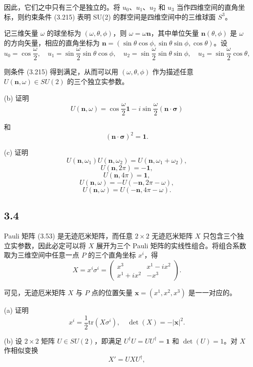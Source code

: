 因此，它们之中只有三个是独立的。将 $ u_0 $、$ u_1 $、$ u_2 $ 和 $ u_3 $ 当作四维空间的直角坐标，则约束条件 (3.215) 表明 SU(2) 的群空间是四维空间中的三维球面 $ S^3 $。

记三维矢量 $ \omega $ 的球坐标为 $ (\omega, \theta, \phi) $，则 $ \omega = \omega \mathbf{n} $，其中单位矢量 $ \mathbf{n}(\theta, \phi) $ 是 $ \omega $ 的方向矢量，相应的直角坐标为 $ \mathbf{n} = (\sin \theta \cos \phi, \sin \theta \sin \phi, \cos \theta) $。设
$$ u_0 = \cos \frac{\omega}{2}, \quad u_1 = \sin \frac{\omega}{2} \sin \theta \cos \phi, \quad u_2 = \sin \frac{\omega}{2} \sin \theta \sin \phi, \quad u_3 = \sin \frac{\omega}{2} \cos \theta, \tag{3.216} $$

则条件 (3.215) 得到满足，从而可以用 $ (\omega, \theta, \phi) $ 作为描述任意 $ U(\mathbf{n}, \omega) \in SU(2) $ 的三个独立实参数。

(b) 证明
$$ U(\mathbf{n}, \omega) = \cos \frac{\omega}{2} \mathbf{1} - i \sin \frac{\omega}{2} (\mathbf{n} \cdot \boldsymbol{\sigma}) \tag{3.217} $$

和
$$ (\mathbf{n} \cdot \boldsymbol{\sigma})^2 = \mathbf{1}. \tag{3.218} $$

(c) 证明
$$ U(\mathbf{n}, \omega_1) U(\mathbf{n}, \omega_2) = U(\mathbf{n}, \omega_1 + \omega_2), \tag{3.219} $$
$$ U(\mathbf{n}, 2\pi) = -\mathbf{1}, \tag{3.220} $$
$$ U(\mathbf{n}, 4\pi) = \mathbf{1}, \tag{3.221} $$
$$ U(\mathbf{n}, \omega) = -U(-\mathbf{n}, 2\pi - \omega), \tag{3.222} $$
$$ U(\mathbf{n}, \omega) = U(-\mathbf{n}, 4\pi - \omega). \tag{3.223} $$

\newpage
\subsection{3.4}
Pauli 矩阵 (3.53) 是无迹厄米矩阵，而任意 $ 2 \times 2 $ 无迹厄米矩阵 $ X $ 只包含三个独立实参数，因此必定可以将 $ X $ 展开为三个 Pauli 矩阵的实线性组合。将组合系数取为三维空间中任意一点 $ P $ 的三个直角坐标 $ x^i $，得
$$ X = x^i \sigma^i = \begin{pmatrix} x^3 & x^1 - i x^2 \\ x^1 + i x^2 & -x^3 \end{pmatrix}. \tag{3.224} $$

可见，无迹厄米矩阵 $ X $ 与 $ P $ 点的位置矢量 $ \mathbf{x} = (x^1, x^2, x^3) $ 是一一对应的。

(a) 证明
$$ x^i = \frac{1}{2} \mathrm{tr}(X \sigma^i), \quad \det(X) = -|\mathbf{x}|^2. \tag{3.225} $$

(b) 设 $ 2 \times 2 $ 矩阵 $ U \in SU(2) $，即满足 $ U^\dagger U = U U^\dagger = \mathbf{1} $ 和 $ \det(U) = 1 $。对 $ X $ 作相似变换 
$$ X' = U X U^\dagger, $$

